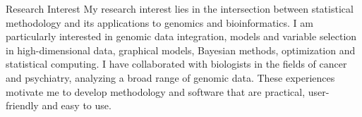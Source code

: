 \documentclass{resume} %
\begin{document}
\begin{rSection}{Research Interest}
My research interest lies in the intersection between statistical methodology and its applications to genomics and bioinformatics.	
I am particularly interested in genomic data integration, models and variable selection in high-dimensional data, graphical models, Bayesian methods, optimization and statistical computing. 
I have collaborated with biologists in the fields of cancer and psychiatry, analyzing a broad range of genomic data. 
These experiences motivate me to develop methodology and software that are practical, user-friendly and easy to use.
\end{rSection}

\end{document}
